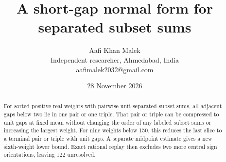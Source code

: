 \documentclass[10pt,letterpaper]{article}
\title{A short-gap normal form for separated subset sums}
\author{Aafi Khan Malek\\ \small Independent researcher, Ahmedabad, India\\
\small\href{mailto:aafimalek2032@gmail.com}{aafimalek2032@gmail.com}}
\date{28 November 2026}
\begin{document}
\maketitle
\begin{abstract}
For sorted positive real weights with pairwise unit-separated
subset sums, all adjacent gaps below two lie in one pair or one
triple. That pair or triple can be compressed to unit gaps at
fixed mean without changing the order of any labeled subset sums
or increasing the largest weight. For nine weights below 150,
this reduces the last slice to a terminal pair or triple with
unit gaps. A separate midpoint estimate gives a new sixth-weight
lower bound. Exact rational replay then excludes two more central
sign orientations, leaving 122 unresolved.
\end{abstract}
\end{document}
